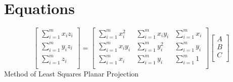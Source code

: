 \documentclass[journal,onecolumn]{IEEEtran}
\begin{document}

%


\appendices
\section{Equations}

\begin{equation}\label{eqn:MLS}
	\left[ {\begin{array}{cc}
			\sum_{i=1}^{m} x_i z_i \\
			\sum_{i=1}^{m} y_i z_i \\
			\sum_{i=1}^{m} z_i \\
			
	\end{array} } \right]
	=
	\left[ {\begin{array}{ccc}
			\sum_{i=1}^{m} x_i^2 		& \sum_{i=1}^{m} x_i y_i 		& \sum_{i=1}^{m} x_i \\
			\sum_{i=1}^{m} x_i y_i 		& \sum_{i=1}^{m} y_i^2 			& \sum_{i=1}^{m} y_i \\
			\sum_{i=1}^{m} x_i 			& \sum_{i=1}^{m} y_i 			& \sum_{i=1}^{m} 1   \\
	\end{array} } \right]
	\left[ {\begin{array}{cc}
			A\\
			B\\
			C\\
	\end{array} } \right]
\end{equation}
\centering
{Method of Least Squares Planar Projection}
\end{document}

